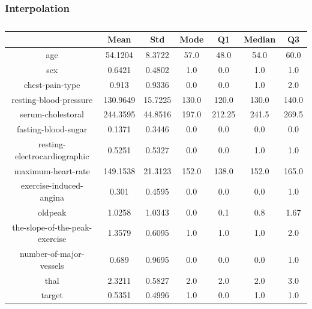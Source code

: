 \documentclass{classrep}
\begin{document}
{{            \subsubsection{Interpolation}
            \label{results:30-percent:interpolation} {
                \begin{table}[!htbp]
                    \centering
                    \begin{tabular}{|c|c|c|c|c|c|c|}
                        \hline
                        & Mean & Std & Mode & Q1 & Median & Q3 \\ \hline
                        age & 54.1204 & 8.3722 & 57.0 & 48.0 & 54.0 & 60.0 \\ \hline
                        sex & 0.6421 & 0.4802 & 1.0 & 0.0 & 1.0 & 1.0 \\ \hline
                        chest-pain-type & 0.913 & 0.9336 & 0.0 & 0.0 & 1.0 & 2.0 \\ \hline
                        resting-blood-pressure & 130.9649 & 15.7225 & 130.0 & 120.0 & 130.0 & 140.0 \\ \hline
                        serum-cholestoral & 244.3595 & 44.8516 & 197.0 & 212.25 & 241.5 & 269.5 \\ \hline
                        fasting-blood-sugar & 0.1371 & 0.3446 & 0.0 & 0.0 & 0.0 & 0.0 \\ \hline
                        resting-electrocardiographic & 0.5251 & 0.5327 & 0.0 & 0.0 & 1.0 & 1.0 \\ \hline
                        maximum-heart-rate & 149.1538 & 21.3123 & 152.0 & 138.0 & 152.0 & 165.0 \\ \hline
                        exercise-induced-angina & 0.301 & 0.4595 & 0.0 & 0.0 & 0.0 & 1.0 \\ \hline
                        oldpeak & 1.0258 & 1.0343 & 0.0 & 0.1 & 0.8 & 1.67 \\ \hline
                        the-slope-of-the-peak-exercise & 1.3579 & 0.6095 & 1.0 & 1.0 & 1.0 & 2.0 \\ \hline
                        number-of-major-vessels & 0.689 & 0.9695 & 0.0 & 0.0 & 0.0 & 1.0 \\ \hline
                        thal & 2.3211 & 0.5827 & 2.0 & 2.0 & 2.0 & 3.0 \\ \hline
                        target & 0.5351 & 0.4996 & 1.0 & 0.0 & 1.0 & 1.0 \\ \hline
                    \end{tabular}
                    \caption{}
                    \label{result_30_Interpolation}
                \end{table}
                \FloatBarrier

}}}
\end{document}
